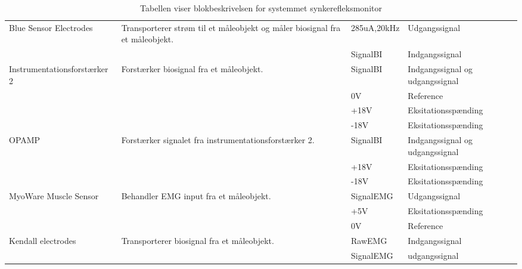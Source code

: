 \begin{table}[H]
\begin{tabular}{|p{4.3cm}|p{3.6cm}|p{2cm}|p{4cm}|}
Blue Sensor Electrodes & Transporterer strøm til et måleobjekt og måler biosignal fra et måleobjekt.
 &  $   ${285uA,20kHz} & Udgangssignal  \\ \cline{3-4}
&  & SignalBI & Indgangssignal   \\ \cline{3-4}  \hline 	 
 
 
Instrumentationsforstærker 2 &Forstærker biosignal fra et måleobjekt. 
&   SignalBI & Indgangssignal og udgangssignal  \\ \cline{3-4}
&  & $   ${0V} & Reference  \\ \cline{3-4}
&  & $   ${+18V} & Eksitationsspænding   \\ \cline{3-4} 
&  & $   ${-18V} & Eksitationsspænding   \\ \cline{3-4} 	\hline 
 	
OPAMP & Forstærker signalet fra instrumentationsforstærker 2. 
&   SignalBI & Indgangssignal og udgangssignal  \\ \cline{3-4}
&  & $   ${+18V} & Eksitationsspænding   \\ \cline{3-4} 
&  & $   ${-18V} & Eksitationsspænding   \\ \cline{3-4}  	 \hline


MyoWare Muscle Sensor & Behandler EMG input fra et måleobjekt. 
&   SignalEMG & Udgangssignal  \\ \cline{3-4}
&  & $   ${+5V} & Eksitationsspænding   \\ \cline{3-4} 
&  & $   ${0V} & Reference   \\ \cline{3-4}  	 \hline
 
 
Kendall electrodes & Transporterer biosignal fra et måleobjekt. 
&    RawEMG & Indgangssignal  \\ \cline{3-4}
&  & SignalEMG & udgangssignal   \\ \cline{3-4} 

 	 
\hline  
\end{tabular}
\caption{Tabellen viser blokbeskrivelsen for systemmet synkerefleksmonitor} \label{BlokBeskr}
\end{table}

\pagebreak

